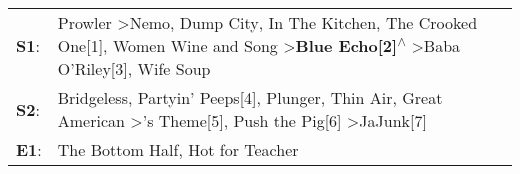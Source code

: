 \begin{supertabular}{p{0.03\textwidth}p{0.92\textwidth}}
 \textbf{S1}:  &  Prowler\textsuperscript{} \textgreater \enspace Nemo\textsuperscript{}, \enspace Dump City\textsuperscript{}, \enspace In The Kitchen\textsuperscript{}, \enspace The Crooked One[1]\textsuperscript{}, \enspace Women Wine and Song\textsuperscript{} \textgreater \enspace \textbf{Blue Echo[2]\textsuperscript{$\wedge$}} \textgreater \enspace Baba O'Riley[3]\textsuperscript{}, \enspace Wife Soup\textsuperscript{}  \enspace  \\
 \textbf{S2}:  &                                                                          Bridgeless\textsuperscript{}, \enspace Partyin' Peeps[4]\textsuperscript{}, \enspace Plunger\textsuperscript{}, \enspace Thin Air\textsuperscript{}, \enspace Great American\textsuperscript{} \textgreater {}'s Theme[5]\textsuperscript{}, \enspace Push the Pig[6]\textsuperscript{} \textgreater \enspace JaJunk[7]\textsuperscript{}  \enspace  \\
 \textbf{E1}:  &                                                                                                                                                                                                                                                                                                                                               The Bottom Half\textsuperscript{}, \enspace Hot for Teacher\textsuperscript{}  \enspace  \\
\end{supertabular}
